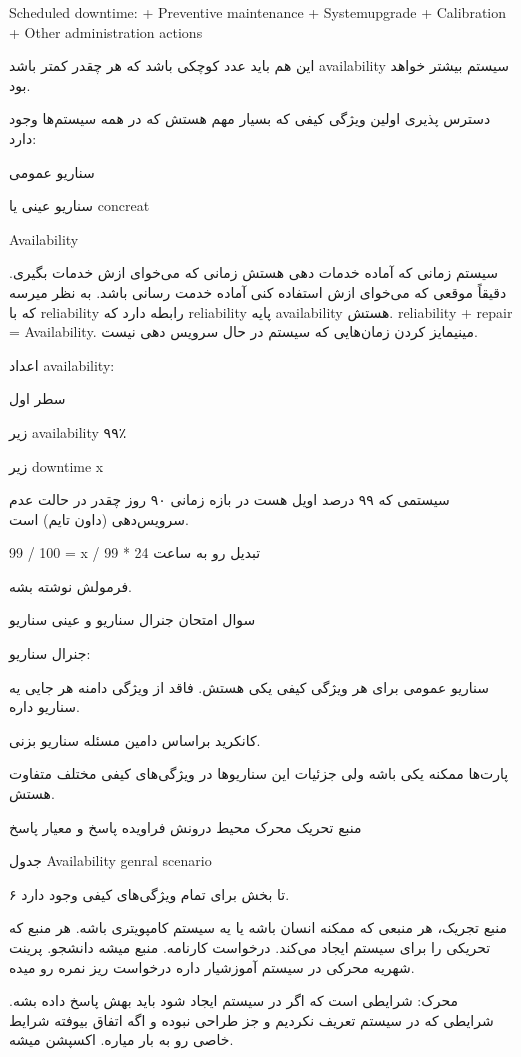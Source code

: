 Scheduled downtime:
+ Preventive maintenance
+ Systemupgrade
+ Calibration
+ Other administration actions

این هم باید عدد کوچکی باشد که هر چقدر کمتر باشد availability سیستم بیشتر خواهد
بود.

دسترس پذیری اولین ویژگی کیفی که بسیار مهم هستش که در همه سیستم‌ها وجود دارد:

سناریو عمومی

سناریو عینی یا concreat

Availability

سیستم زمانی که آماده خدمات دهی هستش زمانی که می‌خوای ازش خدمات بگیری. دقیقاً
موقعی که می‌خوای ازش استفاده کنی آماده خدمت رسانی باشد. به نظر میرسه که با
reliability رابطه دارد که reliability پایه availability هستش. reliability +
repair = Availability. مینیمایز کردن زمان‌هایی که سیستم در حال سرویس دهی نیست.

اعداد availability:

سطر اول

زیر availability ۹۹٪

زیر downtime x

سیستمی که ۹۹ درصد اویل هست در بازه زمانی ۹۰ روز چقدر در حالت عدم سرویس‌دهی (داون
تایم) است.

99 / 100 = x / 99 * 24 تبدیل رو به ساعت

فرمولش نوشته بشه.

سوال امتحان جنرال سناریو و عینی سناریو

جنرال سناریو:

سناریو عمومی برای هر ویژگی کیفی یکی هستش. فاقد از ویژگی دامنه هر جایی یه سناریو داره.

کانکرید براساس دامین مسئله سناریو بزنی.

پارت‌ها ممکنه یکی باشه ولی جزئیات این سناریو‌ها در ویژگی‌های کیفی مختلف متفاوت هستش.

منبع تحریک
محرک 
محیط  درونش فراویده
پاسخ و معیار پاسخ

جدول Availability genral scenario

۶ تا بخش برای تمام ویژگی‌های کیفی وجود دارد.

منبع تجریک، هر منبعی که ممکنه انسان باشه یا یه سیستم کامپویتری باشه. هر منبع که
تحریکی را برای سیستم ایجاد می‌کند. درخواست کارنامه. منبع میشه دانشجو. پرینت
شهریه محرکی در سیستم آموزشیار داره درخواست ریز نمره رو میده.

محرک: شرایطی است که اگر در سیستم ایجاد شود باید بهش پاسخ داده بشه. شرایطی که در
سیستم تعریف نکردیم و جز طراحی نبوده و اگه اتفاق بیوفته شرایط خاصی رو به بار
میاره. اکسپشن میشه.

